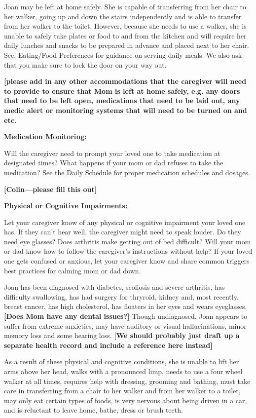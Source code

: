 \documentclass[]{article}
\begin{document}
Joan may be left at home safely. She is capable of transferring from her
chair to her walker, going up and down the stairs independently and is
able to transfer from her walker to the toilet. However, because she
needs to use a walker, she is unable to safely take plates or food to
and from the kitchen and will require her daily lunches and snacks to be
prepared in advance and placed next to her chair. See, Eating/Food
Preferences for guidance on serving daily meals. We also ask that you
make sure to lock the door on your way out.

\textbf{{[}please add in any other accommodations that the caregiver
will need to provide to ensure that Mom is left at home safely, e.g. any
doors that need to be left open, medications that need to be laid out,
any medic alert or monitoring systems that will need to be turned on and
etc. }

\textbf{Medication Monitoring:}

Will the caregiver need to prompt your loved one to take medication at
designated times? What happens if your mom or dad refuses to take the
medication? See the Daily Schedule for proper medication schedules and
dosages.

\textbf{{[}Colin---please fill this out{]}}

\textbf{Physical or Cognitive Impairments:}

Let your caregiver know of any physical or cognitive impairment your
loved one has. If they can't hear well, the caregiver might need to
speak louder. Do they need eye glasses? Does arthritis make getting out
of bed difficult? Will your mom or dad know how to follow the
caregiver's instructions without help? If your loved one gets confused
or anxious, let your caregiver know and share common triggers best
practices for calming mom or dad down.

Joan has been diagnosed with diabetes, scoliosis and severe arthritis,
has difficulty swallowing, has had surgery for thryroid, kidney and,
most recently, breast cancer, has high cholesterol, has floaters in her
eyes and wears eyeglasses. \textbf{{[}Does Mom have any dental
issues?{]}} Though undiagnosed, Joan appears to suffer from extreme
anxieties, may have auditory or visual hallucinations, minor memory loss
and some hearing loss. \textbf{{[}We should probably just draft up a
separate health record and include a reference here instead{]}}

As a result of these physical and cognitive conditions, she is unable to
lift her arms above her head, walks with a pronounced limp, needs to use
a four wheel walker at all times, requires help with dressing, grooming
and bathing, must take care in transferring from a chair to her walker
and from her walker to a toilet, may only eat certain types of foods, is
very nervous about being driven in a car, and is reluctant to leave
home, bathe, dress or brush teeth.
\end{document}
